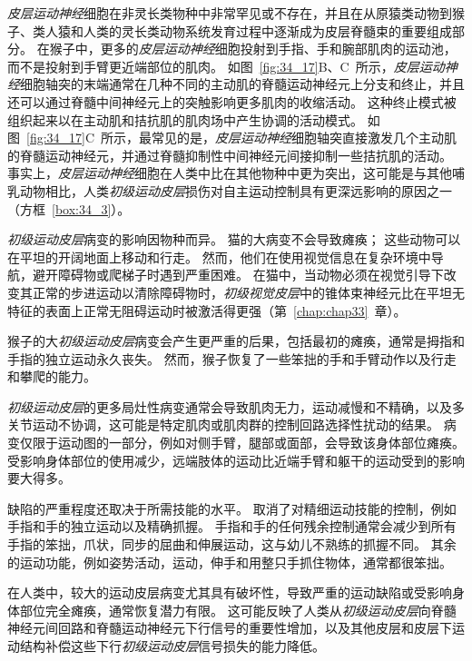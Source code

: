 \textit{皮层运动神经}细胞在非灵长类物种中非常罕见或不存在，并且在从原猿类动物到猴子、类人猿和人类的灵长类动物系统发育过程中逐渐成为皮层脊髓束的重要组成部分。
在猴子中，更多的\textit{皮层运动神经}细胞投射到手指、手和腕部肌肉的运动池，而不是投射到手臂更近端部位的肌肉。
如图~\ref{fig:34_17}B、C~所示，\textit{皮层运动神经}细胞轴突的末端通常在几种不同的主动肌的脊髓运动神经元上分支和终止，并且还可以通过脊髓中间神经元上的突触影响更多肌肉的收缩活动。
这种终止模式被组织起来以在主动肌和拮抗肌的肌肉场中产生协调的活动模式。
如图~\ref{fig:34_17}C~所示，最常见的是，\textit{皮层运动神经}细胞轴突直接激发几个主动肌的脊髓运动神经元，并通过脊髓抑制性中间神经元间接抑制一些拮抗肌的活动。
事实上，\textit{皮层运动神经}细胞在人类中比在其他物种中更为突出，这可能是与其他哺乳动物相比，人类\textit{初级运动皮层}损伤对自主运动控制具有更深远影响的原因之一（方框~\ref{box:34_3}）。



\begin{proposition}[初级运动皮层的损伤导致运动执行障碍] \label{box:34_3}
	
	\quad \quad \textit{初级运动皮层}病变的影响因物种而异。
	猫的大病变不会导致瘫痪；
	这些动物可以在平坦的开阔地面上移动和行走。
	然而，他们在使用视觉信息在复杂环境中导航，避开障碍物或爬梯子时遇到严重困难。
	在猫中，当动物必须在视觉引导下改变其正常的步进运动以清除障碍物时，\textit{初级视觉皮层}中的锥体束神经元比在平坦无特征的表面上正常无阻碍运动时被激活得更强（第~\ref{chap:chap33}~章）。
	
	\quad \quad 猴子的大\textit{初级运动皮层}病变会产生更严重的后果，包括最初的瘫痪，通常是拇指和手指的独立运动永久丧失。
	然而，猴子恢复了一些笨拙的手和手臂动作以及行走和攀爬的能力。
	
	\quad \quad \textit{初级运动皮层}的更多局灶性病变通常会导致肌肉无力，运动减慢和不精确，以及多关节运动不协调，这可能是特定肌肉或肌肉群的控制回路选择性扰动的结果。
	病变仅限于运动图的一部分，例如对侧手臂，腿部或面部，会导致该身体部位瘫痪。
	受影响身体部位的使用减少，远端肢体的运动比近端手臂和躯干的运动受到的影响要大得多。
	
	\quad \quad 缺陷的严重程度还取决于所需技能的水平。
	取消了对精细运动技能的控制，例如手指和手的独立运动以及精确抓握。
	手指和手的任何残余控制通常会减少到所有手指的笨拙，爪状，同步的屈曲和伸展运动，这与幼儿不熟练的抓握不同。
	其余的运动功能，例如姿势活动，运动，伸手和用整只手抓住物体，通常都很笨拙。
	
	\quad \quad 在人类中，较大的运动皮层病变尤其具有破坏性，导致严重的运动缺陷或受影响身体部位完全瘫痪，通常恢复潜力有限。
	这可能反映了人类从\textit{初级运动皮层}向脊髓神经元间回路和脊髓运动神经元下行信号的重要性增加，以及其他皮层和皮层下运动结构补偿这些下行\textit{初级运动皮层}信号损失的能力降低。
	
\end{proposition}


